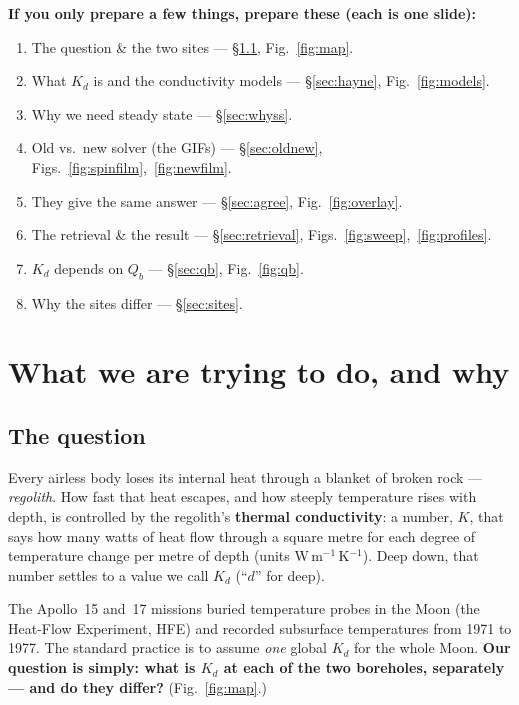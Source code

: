 \documentclass[11pt]{report}
\begin{document}
\vspace{6pt}
\begin{talk}
\textbf{If you only prepare a few things, prepare these (each is one slide):}
\begin{enumerate}[leftmargin=1.4em,itemsep=1pt,topsep=2pt]
\item The question \& the two sites --- \S\ref{sec:question}, Fig.~\ref{fig:map}.
\item What $K_d$ is and the conductivity models --- \S\ref{sec:hayne}, Fig.~\ref{fig:models}.
\item Why we need steady state --- \S\ref{sec:whyss}.
\item Old vs.\ new solver (the GIFs) --- \S\ref{sec:oldnew}, Figs.~\ref{fig:spinfilm},~\ref{fig:newfilm}.
\item They give the same answer --- \S\ref{sec:agree}, Fig.~\ref{fig:overlay}.
\item The retrieval \& the result --- \S\ref{sec:retrieval}, Figs.~\ref{fig:sweep},~\ref{fig:profiles}.
\item $K_d$ depends on $Q_b$ --- \S\ref{sec:qb}, Fig.~\ref{fig:qb}.
\item Why the sites differ --- \S\ref{sec:sites}.
\end{enumerate}
\end{talk}

\clearpage
\tableofcontents
\clearpage

\chapter{What we are trying to do, and why}\label{ch:intro}
\section{The question}\label{sec:question}
Every airless body loses its internal heat through a blanket of broken rock ---
\emph{regolith}. How fast that heat escapes, and how steeply temperature rises
with depth, is controlled by the regolith's \textbf{thermal conductivity}: a
number, $K$, that says how many watts of heat flow through a square metre for
each degree of temperature change per metre of depth (units
W\,m$^{-1}$\,K$^{-1}$). Deep down, that number settles to a value we call
$K_d$ (``$d$'' for deep).

The Apollo~15 and~17 missions buried temperature probes in the Moon (the
Heat-Flow Experiment, HFE) and recorded subsurface temperatures from 1971 to
1977. The standard practice is to assume \emph{one} global $K_d$ for the whole
Moon. \textbf{Our question is simply: what is $K_d$ at each of the two boreholes,
separately --- and do they differ?} (Fig.~\ref{fig:map}.)
\end{document}
